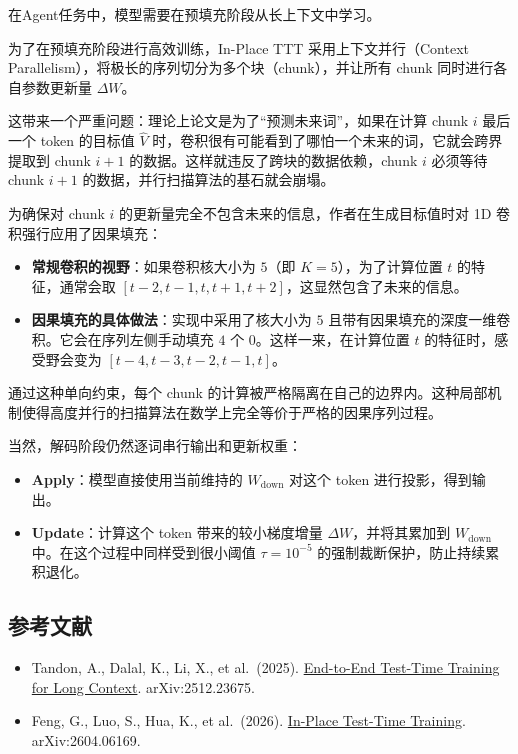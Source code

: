 在Agent任务中，模型需要在预填充阶段从长上下文中学习。

为了在预填充阶段进行高效训练，In-Place TTT 采用上下文并行（Context Parallelism），将极长的序列切分为多个块（chunk），并让所有 chunk 同时进行各自参数更新量 \(\Delta W\)。

这带来一个严重问题：理论上论文是为了``预测未来词''，如果在计算 chunk \(i\) 最后一个 token 的目标值 \(\hat V\) 时，卷积很有可能看到了哪怕一个未来的词，它就会跨界提取到 chunk \(i+1\) 的数据。这样就违反了跨块的数据依赖，chunk \(i\) 必须等待 chunk \(i+1\) 的数据，并行扫描算法的基石就会崩塌。

为确保对 chunk \(i\) 的更新量完全不包含未来的信息，作者在生成目标值时对 1D 卷积强行应用了因果填充：

\begin{itemize}
\tightlist
\item
  \textbf{常规卷积的视野}：如果卷积核大小为 \(5\)（即 \(K=5\)），为了计算位置 \(t\) 的特征，通常会取 \([t-2,t-1,t,t+1,t+2]\)，这显然包含了未来的信息。
\item
  \textbf{因果填充的具体做法}：实现中采用了核大小为 \(5\) 且带有因果填充的深度一维卷积。它会在序列左侧手动填充 \(4\) 个 \(0\)。这样一来，在计算位置 \(t\) 的特征时，感受野会变为 \([t-4,t-3,t-2,t-1,t]\)。
\end{itemize}

通过这种单向约束，每个 chunk 的计算被严格隔离在自己的边界内。这种局部机制使得高度并行的扫描算法在数学上完全等价于严格的因果序列过程。

当然，解码阶段仍然逐词串行输出和更新权重：

\begin{itemize}
\tightlist
\item
  \textbf{Apply}：模型直接使用当前维持的 \(W_{\mathrm{down}}\) 对这个 token 进行投影，得到输出。
\item
  \textbf{Update}：计算这个 token 带来的较小梯度增量 \(\Delta W\)，并将其累加到 \(W_{\mathrm{down}}\) 中。在这个过程中同样受到很小阈值 \(\tau=10^{-5}\) 的强制裁断保护，防止持续累积退化。
\end{itemize}

\hypertarget{ux53c2ux8003ux6587ux732e-148}{%
\subsection{参考文献}\label{ux53c2ux8003ux6587ux732e-148}}

\begin{itemize}
\tightlist
\item
  Tandon, A., Dalal, K., Li, X., et al.~(2025). \href{https://arxiv.org/abs/2512.23675}{End-to-End Test-Time Training for Long Context}. arXiv:2512.23675.
\item
  Feng, G., Luo, S., Hua, K., et al.~(2026). \href{https://arxiv.org/abs/2604.06169}{In-Place Test-Time Training}. arXiv:2604.06169.
\end{itemize}

